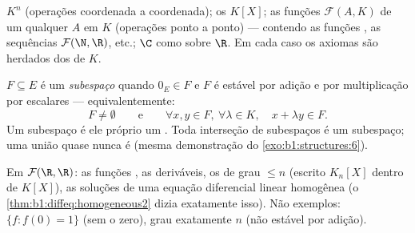\begin{example}\label{ex:b1:vspaces:examples}
$K^n$ (operações coordenada a coordenada); os  $K[X]$; as
funções $\mathcal{F}(A, K)$ de um  qualquer $A$ em $K$ (operações
ponto a ponto) --- contendo as funções , as sequências
$\mathcal{F}(\N, \R)$, etc.; $\C$ como  sobre $\R$. Em cada
caso os axiomas são herdados dos de $K$.
\end{example}

\begin{definition}[Subespaço]\label{def:b1:vspaces:subspace}
$F \subseteq E$ é um \emph{subespaço} quando $0_E \in
F$ e $F$ é
estável por adição e por multiplicação por escalares ---
equivalentemente:
\[
F \neq \emptyset
\qquad\text{e}\qquad
\forall x, y \in F,\ \forall \lambda \in K,\quad
x + \lambda y \in F .
\]
Um subespaço é ele próprio um . Toda interseção de
subespaços é um subespaço; uma união quase nunca é (mesma
demonstração do \cref{exo:b1:structures:6}).
\end{definition}

\begin{example}\label{ex:b1:vspaces:subspaces}
Em $\mathcal{F}(\R, \R)$: as funções , as deriváveis, os
 de grau $\leq n$ (escrito $K_n[X]$ dentro de $K[X]$), as
soluções de uma equação diferencial linear homogênea (o \cref{thm:b1:diffeq:homogeneous2} dizia
exatamente isso). Não exemplos: $\{f : f(0) = 1\}$ (sem o zero), grau exatamente
$n$ (não estável por adição).
\end{example}

